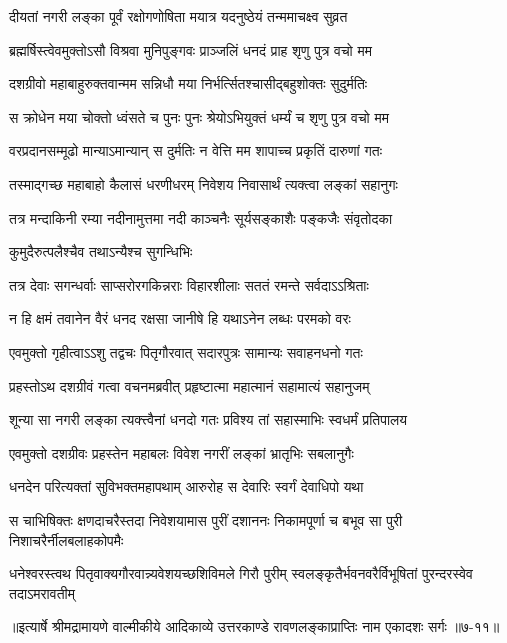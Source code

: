 \twolineshloka
{दीयतां नगरी लङ्का पूर्वं रक्षोगणोषिता}
{मयात्र यदनुष्ठेयं तन्ममाचक्ष्व सुव्रत} %

\twolineshloka
{ब्रह्मर्षिस्त्वेवमुक्तोऽसौ विश्रवा मुनिपुङ्गवः}
{प्राञ्जलिं धनदं प्राह शृणु पुत्र वचो मम} %

\twolineshloka
{दशग्रीवो महाबाहुरुक्तवान्मम सन्निधौ}
{मया निर्भर्त्सितश्चासीद्बहुशोक्तः सुदुर्मतिः} %

\twolineshloka
{स क्रोधेन मया चोक्तो ध्वंसते च पुनः पुनः}
{श्रेयोऽभियुक्तं धर्म्यं च शृणु पुत्र वचो मम} %

\twolineshloka
{वरप्रदानसम्मूढो मान्याऽमान्यान् स दुर्मतिः}
{न वेत्ति मम शापाच्च प्रकृतिं दारुणां गतः} %

\twolineshloka
{तस्माद्गच्छ महाबाहो कैलासं धरणीधरम्}
{निवेशय निवासार्थं त्यक्त्वा लङ्कां सहानुगः} %

\twolineshloka
{तत्र मन्दाकिनी रम्या नदीनामुत्तमा नदी}
{काञ्चनैः सूर्यसङ्काशैः पङ्कजैः संवृतोदका} %

\onelineshloka
{कुमुदैरुत्पलैश्चैव तथाऽन्यैश्च सुगन्धिभिः} %

\twolineshloka
{तत्र देवाः सगन्धर्वाः साप्सरोरगकिन्नराः}
{विहारशीलाः सततं रमन्ते सर्वदाऽऽश्रिताः} %

\twolineshloka
{न हि क्षमं तवानेन वैरं धनद रक्षसा}
{जानीषे हि यथाऽनेन लब्धः परमको वरः} %

\twolineshloka
{एवमुक्तो गृहीत्वाऽऽशु तद्वचः पितृगौरवात्}
{सदारपुत्रः सामान्यः सवाहनधनो गतः} %

\twolineshloka
{प्रहस्तोऽथ दशग्रीवं गत्वा वचनमब्रवीत्}
{प्रहृष्टात्मा महात्मानं सहामात्यं सहानुजम्} %

\twolineshloka
{शून्या सा नगरी लङ्का त्यक्त्त्वैनां धनदो गतः}
{प्रविश्य तां सहास्माभिः स्वधर्मं प्रतिपालय} %

\twolineshloka
{एवमुक्तो दशग्रीवः प्रहस्तेन महाबलः}
{विवेश नगरीं लङ्कां भ्रातृभिः सबलानुगैः} %

\twolineshloka
{धनदेन परित्यक्तां सुविभक्तमहापथाम्}
{आरुरोह स देवारिः स्वर्गं देवाधिपो यथा} %

\twolineshloka
{स चाभिषिक्तः क्षणदाचरैस्तदा निवेशयामास पुरीं दशाननः}
{निकामपूर्णा च बभूव सा पुरी निशाचरैर्नीलबलाहकोपमैः} %

\twolineshloka
{धनेश्वरस्त्वथ पितृवाक्यगौरवान्न्यवेशयच्छशिविमले गिरौ पुरीम्}
{स्वलङ्कृतैर्भवनवरैर्विभूषितां पुरन्दरस्वेव तदाऽमरावतीम्} %


॥इत्यार्षे श्रीमद्रामायणे वाल्मीकीये आदिकाव्ये उत्तरकाण्डे रावणलङ्काप्राप्तिः नाम एकादशः सर्गः ॥७-११॥
